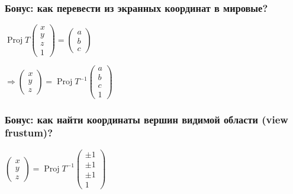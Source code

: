 \documentclass[10pt]{beamer}
\begin{document}
\begin{frame}[fragile]
\frametitle{Бонус: как перевести из экранных координат в мировые?}
\begin{center}
\begin{math}
\operatorname{Proj} T \begin{pmatrix}x \\ y \\ z \\ 1\end{pmatrix} =
\begin{pmatrix}a \\ b \\ c\end{pmatrix}
\end{math}
\end{center}
\begin{center}
\begin{math}
\Longrightarrow \begin{pmatrix}x \\ y \\ z\end{pmatrix} =
\operatorname{Proj} T^{-1} \begin{pmatrix}a \\ b \\ c \\ 1\end{pmatrix}
\end{math}
\end{center}
\end{frame}

\begin{frame}[fragile]
\frametitle{Бонус: как найти координаты вершин видимой области (view frustum)?}
\begin{center}
\begin{math}
\begin{pmatrix}x \\ y \\ z\end{pmatrix} =
\operatorname{Proj} T^{-1} \begin{pmatrix}\pm 1 \\ \pm 1 \\ \pm 1 \\ 1\end{pmatrix}
\end{math}
\end{center}
\end{frame}
\end{document}
